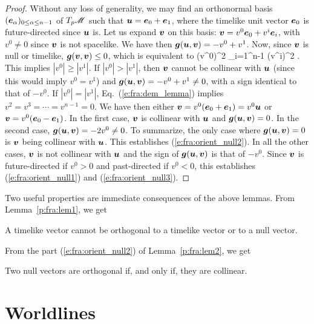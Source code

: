 \begin{proof}
Without any loss of generality,
we may find an orthonormal basis $(\bm{e}_\alpha)_{0\leq \alpha\leq n-1}$ of
$T_p\mathscr{M}$ such that $\bm{u} = \bm{e}_0 + \bm{e}_1$, where the timelike unit vector
$\bm{e}_0$ is future-directed since $\bm{u}$ is. Let us expand $\bm{v}$ on this
basis: $\bm{v} = v^0 \bm{e}_0 + v^i \bm{e}_i$, with $v^0 \not = 0$ since
$\bm{v}$ is not spacelike. We have then
$\bm{g}(\bm{u},\bm{v}) = -v^0 + v^1$. Now, since $\bm{v}$ is null or timelike,
$\bm{g}(\bm{v},\bm{v}) \leq 0$, which is equivalent to
\be \label{e:fra:dem_lemma}
    (v^0)^2 \geq \sum_{i=1}^{n-1} (v^i)^2 .
\ee
This implies $|v^0| \geq |v^1|$.
If $|v^0| > |v^1|$, then $\bm{v}$ cannot be collinear with $\bm{u}$
(since this would imply $v^0 = v^1$)
and
$\bm{g}(\bm{u},\bm{v}) = -v^0 + v^1 \neq 0$, with a sign identical to that of $-v^0$. If $|v^0| = |v^1|$, Eq.~(\ref{e:fra:dem_lemma})
implies $v^2=v^3=\cdots=v^{n-1} = 0$. We have then
either $\bm{v} = v^0 (\bm{e}_0 + \bm{e}_1) = v^0 \bm{u}$ or
$\bm{v} = v^0 (\bm{e}_0 - \bm{e}_1)$. In the first case, $\bm{v}$ is collinear with $\bm{u}$
and $\bm{g}(\bm{u},\bm{v})=0$. In
the second case, $\bm{g}(\bm{u},\bm{v}) = -2 v^0 \neq 0$. To summarize, the
only case where $\bm{g}(\bm{u},\bm{v})=0$ is $\bm{v}$ being collinear with $\bm{u}$.
This establishes (\ref{e:fra:orient_null2}).
In all the other cases, $\bm{v}$ is not collinear with $\bm{u}$ and the sign of $\bm{g}(\bm{u},\bm{v})$
is that of $-v^0$. Since
$\bm{v}$ is future-directed if $v^0 > 0$
and past-directed if $v^0 < 0$, this establishes (\ref{e:fra:orient_null1})
and (\ref{e:fra:orient_null3}).
\end{proof}

Two useful properties are immediate consequences of the above lemmas.
From Lem\-ma~\ref{p:fra:lem1}, we get

\begin{prop}
\label{p:fra:corol1}
A timelike vector cannot be orthogonal to a timelike vector or to a null vector.
\end{prop}

From the part (\ref{e:fra:orient_null2}) of Lemma~\ref{p:fra:lem2}, we get

\begin{prop}
\label{p:fra:corol2}
Two null vectors are orthogonal if, and only if, they are collinear.
\end{prop}


\section{Worldlines} \label{s:fra:worldlines}

